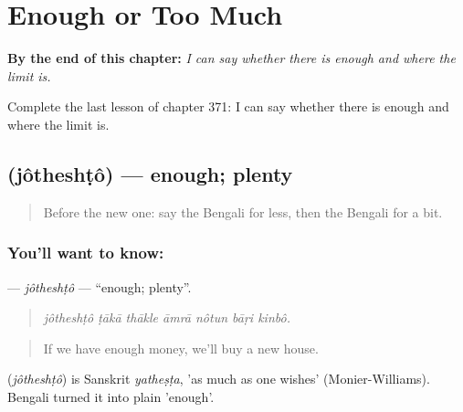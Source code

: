 
\chapter{Enough or Too Much}
\label{ch:bn-enough-or-too-much}

\begin{chapteropening}
\textbf{By the end of this chapter:} \emph{I can say whether there is enough and where the limit is.}

Complete the last lesson of chapter 371: I can say whether there is enough and where the limit is.
\end{chapteropening}

\section[\texorpdfstring{\bn{যথেষ্ট} (jôtheshṭô)}{যথেষ্ট (jôtheshṭô)}]{ (jôtheshṭô) — enough; plenty}

\label{lesson:BN-C371-jotheshto}



\begin{quote}
Before the new one: say the Bengali for less, then the Bengali for a bit.
\end{quote}

\subsection*{You'll want to know: }
\textbf{} — \emph{jôtheshṭô} — \textquotedblleft{}enough; plenty\textquotedblright{}.

\begin{quote}
      
\end{quote}

\begin{quote}
\emph{jôtheshṭô ṭākā thākle āmrā nôtun bāṛi kinbô.}
\end{quote}

\begin{quote}
If we have enough money, we'll buy a new house.
\end{quote}

\begin{cousinweb}
\textbf{} (\emph{jôtheshṭô}) is Sanskrit \emph{yatheṣṭa}, 'as much as one wishes' (Monier-Williams). Bengali turned it into plain 'enough'.
\end{cousinweb}

